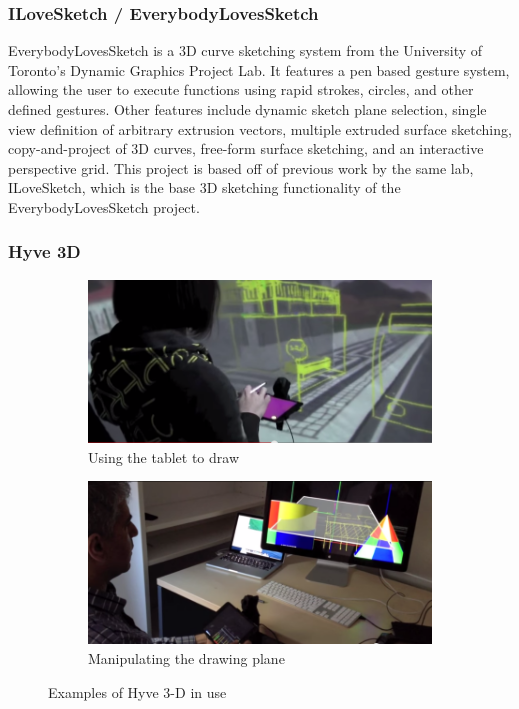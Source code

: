 \documentclass{article}
\begin{document}
\subsubsection{ILoveSketch / EverybodyLovesSketch}

EverybodyLovesSketch is a 3D curve sketching system from the University of Toronto's Dynamic Graphics Project Lab. It features a pen based gesture system, allowing the user to execute functions using rapid strokes, circles, and other defined gestures. Other features include dynamic sketch plane selection, single view definition of arbitrary extrusion vectors, multiple extruded surface sketching, copy-and-project of 3D curves, free-form surface sketching, and an interactive perspective grid. This project is based off of previous work by the same lab, ILoveSketch, which is the base 3D sketching functionality of the EverybodyLovesSketch project.

\subsubsection{Hyve 3D}

\begin{figure}[h]

\begin{subfigure}{\textwidth}
\includegraphics[width=0.9\linewidth]{Hyve3D1}
\caption{Using the tablet to draw}
\end{subfigure}
\begin{subfigure}{\textwidth}
\includegraphics[width=0.9\linewidth]{Hyve3D2}
\caption{Manipulating the drawing plane}
\end{subfigure}

\caption{Examples of Hyve 3-D in use}
\end{figure}
\end{document}
